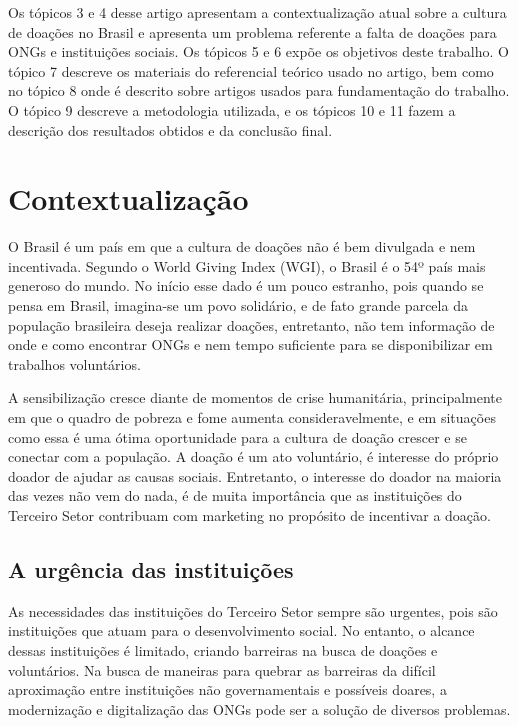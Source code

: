 \documentclass[conference]{IEEEtran}
\begin{document}
Os tópicos 3 e 4 desse artigo apresentam a contextualização atual sobre a cultura de doações no Brasil e apresenta um problema referente a falta de doações para ONGs e instituições sociais. Os tópicos 5 e 6 expõe os objetivos deste trabalho. O tópico 7 descreve os materiais do referencial teórico usado no artigo, bem como no tópico 8 onde é descrito sobre artigos usados para fundamentação do trabalho.  O tópico 9 descreve a metodologia utilizada, e os tópicos 10 e 11 fazem a descrição dos resultados obtidos e da conclusão final.


\section{Contextualização}
O Brasil é um país em que a cultura de doações não é bem divulgada e nem incentivada. Segundo o World Giving Index (WGI), o Brasil é o 54º país mais generoso do mundo. No início esse dado é um pouco estranho, pois quando se pensa em Brasil, imagina-se um povo solidário, e de fato grande parcela da população brasileira deseja realizar doações, entretanto, não tem informação de onde e como encontrar ONGs e nem tempo suficiente para se disponibilizar em trabalhos voluntários. \cite{sitepolitize01}

A sensibilização cresce diante de momentos de crise humanitária, principalmente em que o quadro de pobreza e fome aumenta consideravelmente, e em situações como essa é uma ótima oportunidade para a cultura de doação crescer e se conectar com a população.  A doação é um ato voluntário, é interesse do próprio doador de ajudar as causas sociais. Entretanto, o interesse do doador na maioria das vezes não vem do nada, é de muita importância que as instituições do Terceiro Setor contribuam com marketing no propósito de incentivar a doação.

\subsection{A urgência das instituições}

As necessidades das instituições do Terceiro Setor sempre são urgentes, pois são instituições que atuam para o desenvolvimento social. No entanto, o alcance dessas instituições é limitado, criando barreiras na busca de doações e voluntários.\cite{sitecodebit} Na busca de maneiras para quebrar as barreiras da difícil aproximação entre instituições não governamentais e possíveis doares, a modernização e digitalização das ONGs pode ser a solução de diversos problemas. \cite{roche2000avaliaccao}
\end{document}
